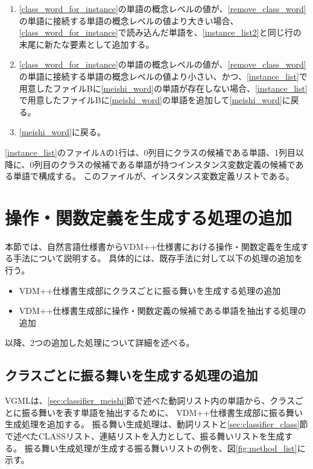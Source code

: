 \begin{enumerate}
\begin{enumerate}
\begin{enumerate}
\begin{enumerate}
                            \item \ref{class_word_for_instance}の単語の概念レベルの値が、\ref{remove_class_word}の単語に接続する単語の概念レベルの値より大きい場合、\ref{class_word_for_instance}で読み込んだ単語を、\ref{instance_list2}と同じ行の末尾に新たな要素として追加する。
                            \item \ref{class_word_for_instance}の単語の概念レベルの値が、\ref{remove_class_word}の単語に接続する単語の概念レベルの値より小さい、かつ、\ref{instance_list}で用意したファイルBに\ref{meishi_word}の単語が存在しない場合、\ref{instance_list}で用意したファイルBに\ref{meishi_word}の単語を追加して\ref{meishi_word}に戻る。
                            \item \ref{meishi_word}に戻る。
                        \end{enumerate}
                \end{enumerate}
        \end{enumerate}
\end{enumerate}

\ref{instance_list}のファイルAの1行は、0列目にクラスの候補である単語、1列目以降に、0列目のクラスの候補である単語が持つインスタンス変数定義の候補である単語で構成する。
このファイルが、インスタンス変数定義リストである。

\section{操作・関数定義を生成する処理の追加}
\label{sec:operate_func}
本節では、自然言語仕様書からVDM++仕様書における操作・関数定義を生成する手法について説明する。
具体的には、既存手法に対して以下の処理の追加を行う。

\begin{itemize}
    \item VDM++仕様書生成部にクラスごとに振る舞いを生成する処理の追加
    \item VDM++仕様書生成部に操作・関数定義の候補である単語を抽出する処理の追加
\end{itemize}

以降、2つの追加した処理について詳細を述べる。

\subsection{クラスごとに振る舞いを生成する処理の追加}
\label{sec:method_generator}
VGMLは、\ref{sec:classifier_meishi}節で述べた動詞リスト内の単語から、クラスごとに振る舞いを表す単語を抽出するために、
VDM++仕様書生成部に振る舞い生成処理を追加する。
振る舞い生成処理は、動詞リストと\ref{sec:classifier_class}節で述べたCLASSリスト、連結リストを入力として、振る舞いリストを生成する。
振る舞い生成処理が生成する振る舞いリストの例を、図\ref{fig:method_list}に示す。

